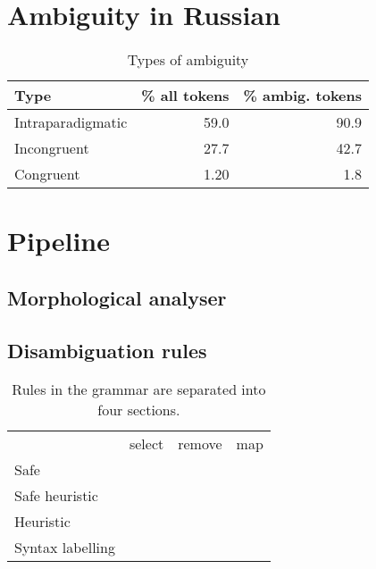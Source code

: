 \documentclass[11pt]{article}
\begin{document}
\cite{trosterud2009}

\section{Ambiguity in Russian}



\begin{table}
  \centering
  \begin{tabular}{|l|r|r|}
    \hline
    \textbf{Type}     & \textbf{\% all tokens} & \textbf{\% ambig. tokens} \\
    \hline
    Intraparadigmatic & 59.0                   & 90.9   \\
    Incongruent       & 27.7                   & 42.7   \\ 
    Congruent         & 1.20                   & 1.8    \\ 
    \hline
  \end{tabular}
  \caption{Types of ambiguity}
  \label{table:ambiguity}
\end{table}


\section{Pipeline}


\subsection{Morphological analyser}

\cite{yablonsky1999russian}


\subsection{Disambiguation rules}

\begin{table}
  \centering
  \begin{tabular}{lrrr}
    \hline
         & {\sc select} & {\sc remove} & {\sc map} \\
    Safe & & & \\
    Safe heuristic  & & & \\
    Heuristic &  & & \\
    Syntax labelling &  &   & \\ 
    \hline
  \end{tabular}
  \caption{Rules in the grammar are separated into four sections. }
\end{table}
\end{document}
